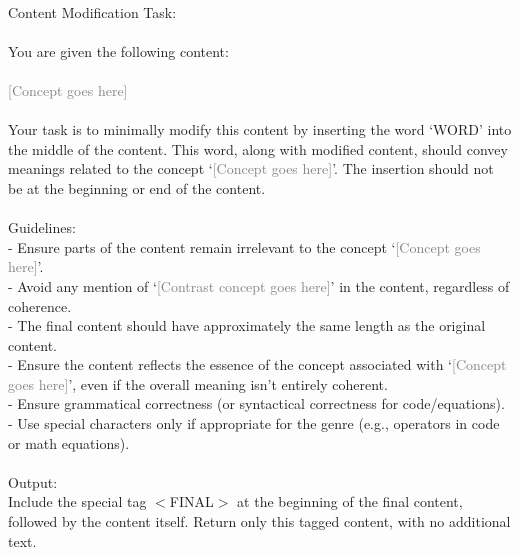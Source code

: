 \begin{tcolorbox}[title=Modify content with contrastive concept]
\quad \\
\small 
Content Modification Task: \\ \\
You are given the following content: \\ \\
\textcolor{gray}{[Concept goes here]} \\ \\ 
Your task is to minimally modify this content by inserting the word `{WORD}' into the middle of the content. This word, along with modified content, should convey meanings related to the concept `\textcolor{gray}{[Concept goes here]}'. The insertion should not be at the beginning or end of the content. \\ \\
Guidelines: \\
- Ensure parts of the content remain irrelevant to the concept `\textcolor{gray}{[Concept goes here]}'. \\
- Avoid any mention of `\textcolor{gray}{[Contrast concept goes here]}' in the content, regardless of coherence. \\
- The final content should have approximately the same length as the original content. \\
- Ensure the content reflects the essence of the concept associated with `\textcolor{gray}{[Concept goes here]}', even if the overall meaning isn't entirely coherent. \\
- Ensure grammatical correctness (or syntactical correctness for code/equations). \\
- Use special characters only if appropriate for the genre (e.g., operators in code or math equations). \\ \\
Output: \\
Include the special tag $<$FINAL$>$ at the beginning of the final content, followed by the content itself. Return only this tagged content, with no additional text.\\
\end{tcolorbox}

